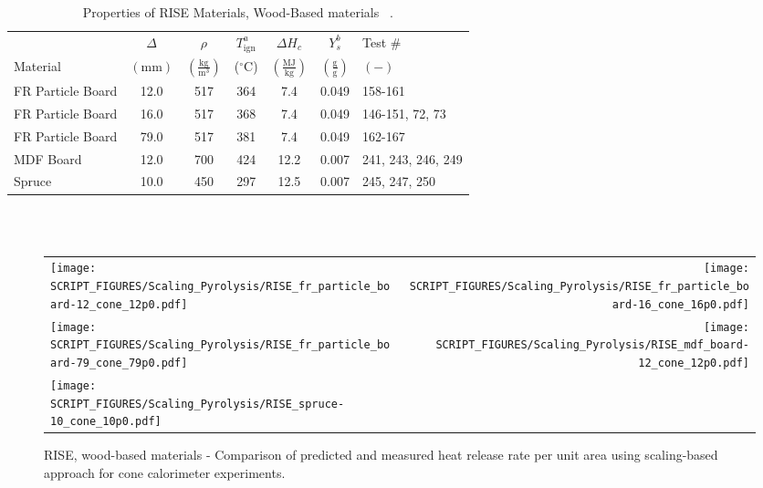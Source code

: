 \begin{table}[!h]
\caption[Properties of RISE Materials, Wood-Based materials]{Properties of RISE Materials, Wood-Based materials ~\cite{RISE:Fire_Database}.}
\centering
\begin{tabular}{|l|c|c|c|c|c|p{5.5cm}|}
\hline
            & \centering$\Delta$& \centering$\rho$& \centering$T_{\mathrm{ign}}^{a}$&\centering$\Delta H_{c}$&\centering$Y_{s}^{b}$ & Test \# \\
Material    & \centering$\mathrm{\left(mm\right)}$ & \centering$\mathrm{\left(\frac{kg}{m^{3}}\right)}$ &  \centering($\mathrm{^{\circ}C}$)   & \centering$\left(\mathrm{\frac{MJ}{kg}}\right)$ & \centering$\mathrm{\left(\frac{g}{g}\right)}$ & $\mathrm{( - )}$  \\ \hline
\hline
FR Particle Board                                 & 12.0 & 517 & 364 & 7.4 & 0.049 & 158-161 \\\hline
FR Particle Board                                 & 16.0 & 517 & 368 & 7.4 & 0.049 & 146-151, 72, 73 \\\hline
FR Particle Board                                 & 79.0 & 517 & 381 & 7.4 & 0.049 & 162-167 \\\hline
MDF Board                                         & 12.0 & 700 & 424 & 12.2 & 0.007 & 241, 243, 246, 249 \\\hline
Spruce                                            & 10.0 & 450 & 297 & 12.5 & 0.007 & 245, 247, 250 \\\hline
\end{tabular}
\label{Properties_RISE_Materials_Wood-Based}
\end{table}
\vspace{-0.4cm}
\\
\\

\begin{figure}[p]
\begin{tabular*}{\textwidth}{l@{\extracolsep{\fill}}r}
\texttt{[image: SCRIPT\_FIGURES/Scaling\_Pyrolysis/RISE\_fr\_particle\_board-12\_cone\_12p0.pdf]} &
\texttt{[image: SCRIPT\_FIGURES/Scaling\_Pyrolysis/RISE\_fr\_particle\_board-16\_cone\_16p0.pdf]} \\
\texttt{[image: SCRIPT\_FIGURES/Scaling\_Pyrolysis/RISE\_fr\_particle\_board-79\_cone\_79p0.pdf]} &
\texttt{[image: SCRIPT\_FIGURES/Scaling\_Pyrolysis/RISE\_mdf\_board-12\_cone\_12p0.pdf]} \\
\texttt{[image: SCRIPT\_FIGURES/Scaling\_Pyrolysis/RISE\_spruce-10\_cone\_10p0.pdf]} &
\end{tabular*}
\caption[HRRPUA of RISE Materials using scaling model, wood-based materials]
{RISE, wood-based materials - Comparison of predicted and measured heat release rate per unit area using scaling-based approach for cone calorimeter experiments.}
\label{RISE_Materials_HRR_Wood-Based}
\end{figure}

